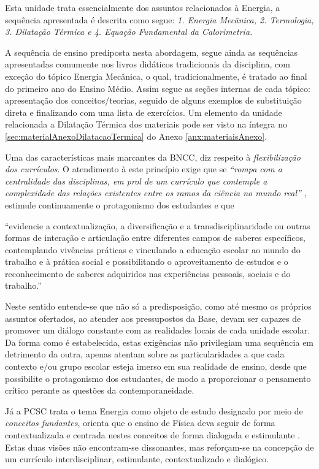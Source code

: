 Esta unidade trata essencialmente dos assuntos relacionados à Energia, a sequência apresentada é descrita como segue: \emph{1. Energia Mecânica, 2. Termologia, 3. Dilatação Térmica e 4. Equação Fundamental da Calorimetria.}

A sequência de ensino prediposta nesta abordagem, segue ainda as sequências apresentadas comumente nos livros didáticos tradicionais da disciplina, com exceção do tópico Energia Mecânica, o qual, tradicionalmente, é tratado ao final do primeiro ano do Ensino Médio. Assim segue as seções internas de cada tópico: apresentação dos conceitos/teorias, seguido de alguns exemplos de substituição direta e finalizando com uma lista de exercícios. Um elemento da unidade relacionada a Dilatação Térmica dos materiais pode ser visto na íntegra no \autoref{sec:materialAnexoDilatacaoTermica} do Anexo \ref{anx:materiaisAnexo}.  

Uma das características mais marcantes da \ac{BNCC}, diz respeito à \emph{flexibilização dos currículos}. O atendimento à este princípio exige que se \emph{``rompa com a centralidade das disciplinas, em prol de um currículo que contemple a complexidade das relações existentes entre os ramos da ciência no mundo real''} \cite{BRASIL:2017}, estimule continuamente o protagonismo dos estudantes e que

\begin{citacao}
    ``evidencie a contextualização, a diversificação e a transdisciplinaridade ou outras formas de interação e articulação entre diferentes campos de saberes específicos, contemplando vivências práticas e vinculando a educação escolar ao mundo do trabalho e à prática social e possibilitando o aproveitamento de estudos e o reconhecimento de saberes adquiridos nas experiências pessoais, sociais e do trabalho.'' \cite{BRASIL:2018}
\end{citacao}
Neste sentido entende-se que não só a predisposição, como até mesmo os próprios assuntos ofertados, ao atender aos pressupostos da Base, devam ser capazes de promover um diálogo constante com as realidades locais de cada unidade escolar. Da forma como é estabelecida, estas exigências não privilegiam uma sequência em detrimento da outra, apenas atentam sobre as particularidades a que cada contexto e/ou grupo escolar esteja imerso em sua realidade de ensino, desde que possibilite o protagonismo dos estudantes, de modo a proporcionar o pensamento crítico perante as questões da contemporaneidade.

Já a \ac{PCSC} trata o tema Energia como objeto de estudo designado por meio de \emph{conceitos fundantes}, orienta que o ensino de Física deva seguir de forma contextualizada e centrada nestes conceitos de forma dialogada e estimulante \cite[p.~164]{BRASIL:2017}. Estas duas visões não encontram-se dissonantes, mas reforçam-se na concepção de um currículo interdisciplinar, estimulante, contextualizado e dialógico.

